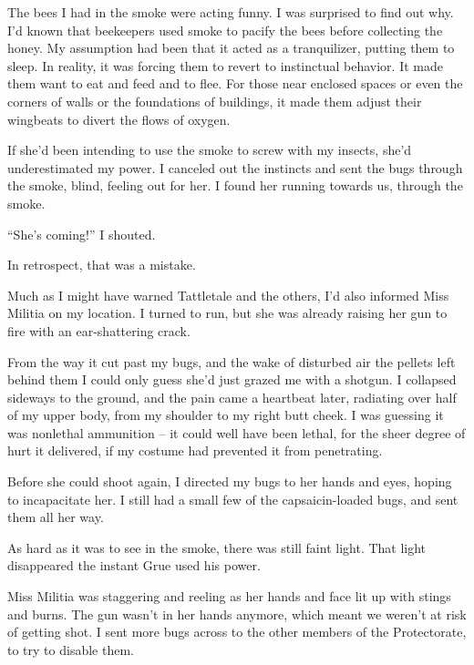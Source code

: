 The bees I had in the smoke were acting funny.  I was surprised to find out why.  I'd known that beekeepers used smoke to pacify the bees before collecting the honey.  My assumption had been that it acted as a tranquilizer, putting them to sleep.  In reality, it was forcing them to revert to instinctual behavior.  It made them want to eat and feed and to flee.  For those near enclosed spaces or even the corners of walls or the foundations of buildings, it made them adjust their wingbeats to divert the flows of oxygen.



If she'd been intending to use the smoke to screw with my insects, she'd underestimated my power.  I canceled out the instincts and sent the bugs through the smoke, blind, feeling out for her.  I found her running towards us, through the smoke.



``She's coming!'' I shouted.



In retrospect, that was a mistake.



Much as I might have warned Tattletale and the others, I'd also informed Miss Militia on my location.  I turned to run, but she was already raising her gun to fire with an ear-shattering crack.



From the way it cut past my bugs, and the wake of disturbed air the pellets left behind them I could only guess she'd just grazed me with a shotgun.  I collapsed sideways to the ground, and the pain came a heartbeat later, radiating over half of my upper body, from my shoulder to my right butt cheek.  I was guessing it was nonlethal ammunition – it could well have been lethal, for the sheer degree of hurt it delivered, if my costume had prevented it from penetrating.



Before she could shoot again, I directed my bugs to her hands and eyes, hoping to incapacitate her.  I still had a small few of the capsaicin-loaded bugs, and sent them all her way.



As hard as it was to see in the smoke, there was still faint light.  That light disappeared the instant Grue used his power.



Miss Militia was staggering and reeling as her hands and face lit up with stings and burns.  The gun wasn't in her hands anymore, which meant we weren't at risk of getting shot.  I sent more bugs across to the other members of the Protectorate, to try to disable them.



